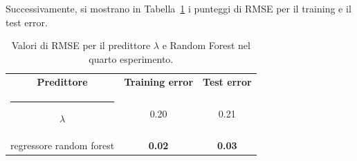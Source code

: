 \documentclass[12pt]{report}
\makeatletter
\theoremstyle{definition}
\newcommand{\thickhline}{%
    \noalign {\ifnum 0=`}\fi \hrule height 1pt
    \futurelet \reserved@a \@xhline
}
\makeatother
\begin{document}
Successivamente, si mostrano in Tabella~\ref{rmse_exp4} i punteggi di RMSE per il training e il test error. 
\begin{table}
\centering
\begin{adjustbox}{max width=\textwidth}
 \begin{tabular}{|c|c|c|} 
 \hline
\textbf{Predittore} & \textbf{Training error} & \textbf{Test error}
\\ [0.5ex] 
 \thickhline
 $\lambda$ & 0.20 & 0.21 \\
 regressore random forest & \textbf{0.02} & \textbf{0.03}
 \\
 \hline
\end{tabular}
\end{adjustbox}
\caption{Valori di RMSE per il predittore $\lambda$ e Random Forest nel quarto esperimento.}
\label{rmse_exp4}
\end{table}
\end{document}
